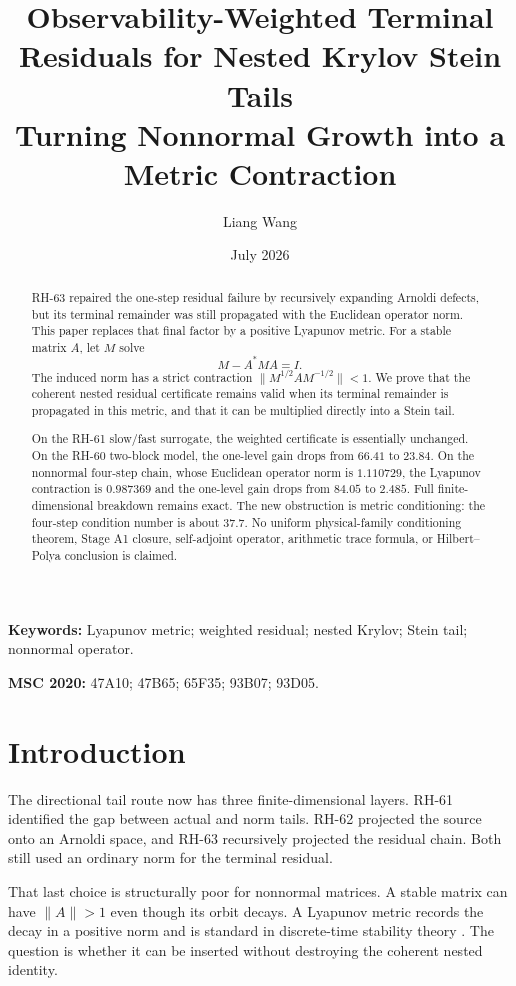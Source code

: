 \documentclass[11pt]{article}
\title{Observability-Weighted Terminal Residuals for Nested Krylov Stein Tails\\
\large Turning Nonnormal Growth into a Metric Contraction}
\author{Liang Wang}
\date{July 2026}
\begin{document}
\maketitle

\begin{abstract}
RH-63 repaired the one-step residual failure by recursively expanding
Arnoldi defects, but its terminal remainder was still propagated with the
Euclidean operator norm.  This paper replaces that final factor by a
positive Lyapunov metric.  For a stable matrix $A$, let $M$ solve
\[
 M-A^*MA=I.
\]
The induced norm has a strict contraction
$\|M^{1/2}AM^{-1/2}\|<1$.  We prove that the coherent nested residual
certificate remains valid when its terminal remainder is propagated in this
metric, and that it can be multiplied directly into a Stein tail.

On the RH-61 slow/fast surrogate, the weighted certificate is essentially
unchanged.  On the RH-60 two-block model, the one-level gain drops from
$66.41$ to $23.84$.  On the nonnormal four-step chain, whose Euclidean
operator norm is $1.110729$, the Lyapunov contraction is $0.987369$ and the
one-level gain drops from $84.05$ to $2.485$.  Full finite-dimensional
breakdown remains exact.  The new obstruction is metric conditioning: the
four-step condition number is about $37.7$.  No uniform physical-family
conditioning theorem, Stage A1 closure, self-adjoint operator, arithmetic
trace formula, or Hilbert--Polya conclusion is claimed.
\end{abstract}

\noindent\textbf{Keywords:} Lyapunov metric; weighted residual; nested
Krylov; Stein tail; nonnormal operator.

\medskip
\noindent\textbf{MSC 2020:} 47A10; 47B65; 65F35; 93B07; 93D05.

\section{Introduction}

The directional tail route now has three finite-dimensional layers.  RH-61
identified the gap between actual and norm tails.  RH-62 projected the
source onto an Arnoldi space, and RH-63 recursively projected the residual
chain.  Both still used an ordinary norm for the terminal residual.

That last choice is structurally poor for nonnormal matrices.  A stable
matrix can have $\|A\|>1$ even though its orbit decays.  A Lyapunov metric
records the decay in a positive norm and is standard in discrete-time
stability theory \citep{ZhouDoyleGlover1996}.  The question is whether it can
be inserted without destroying the coherent nested identity.
\end{document}
